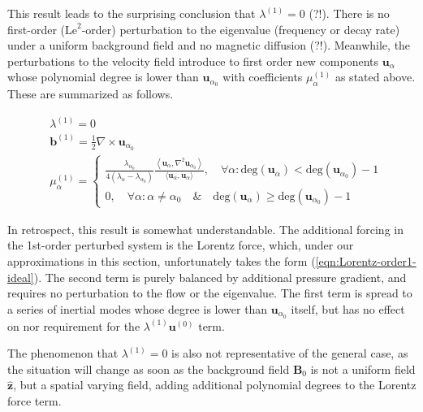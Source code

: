 %
This result leads to the surprising conclusion that $\lambda^{(1)} = 0$ (?!). There is no first-order ($\mathrm{Le}^2$-order) perturbation to the eigenvalue (frequency or decay rate) under a uniform background field and no magnetic diffusion (?!). 
Meanwhile, the perturbations to the velocity field introduce to first order new components $\mathbf{u}_\alpha$ whose polynomial degree is lower than $\mathbf{u}_{\alpha_0}$ with coefficients $\mu_\alpha^{(1)}$ as stated above. These are summarized as follows.
%
\begin{mdframed}[style=HighlightBox, frametitle={First-order perturbations under uniform background field, neglect magnetic diffusion}]
    \begin{align*}
        &\lambda^{(1)} = 0
        \\
        &\mathbf{b}^{(1)} = \frac{1}{2} \nabla\times \mathbf{u}_{\alpha_0} 
        \\
        &\mu_\alpha^{(1)} = \left\{\begin{aligned}
            \frac{\lambda_{\alpha_0}}{4(\lambda_\alpha - \lambda_{\alpha_0})} \frac{\left\langle \mathbf{u}_{\alpha}, \nabla^2 \mathbf{u}_{\alpha_0} \right\rangle}{\langle \mathbf{u}_{\alpha}, \mathbf{u}_{\alpha} \rangle},\quad \forall \alpha: \mathrm{deg}(\mathbf{u}_\alpha) < \mathrm{deg}(\mathbf{u}_{\alpha_0}) - 1 \\ 
            0,\quad \forall \alpha: \alpha \neq \alpha_0 \quad \& \quad \mathrm{deg}(\mathbf{u}_\alpha) \geq \mathrm{deg}(\mathbf{u}_{\alpha_0}) - 1
        \end{aligned}\right.
    \end{align*}
\end{mdframed}

In retrospect, this result is somewhat understandable. The additional forcing in the 1st-order perturbed system is the Lorentz force, which, under our approximations in this section, unfortunately takes the form (\ref{eqn:Lorentz-order1-ideal}). The second term is purely balanced by additional pressure gradient, and requires no perturbation to the flow or the eigenvalue. The first term is spread to a series of inertial modes whose degree is lower than $\mathbf{u}_{\alpha_0}$ itself, but has no effect on nor requirement for the $\lambda^{(1)} \mathbf{u}^{(0)}$ term. 

The phenomenon that $\lambda^{(1)} = 0$ is also not representative of the general case, as the situation will change as soon as the background field $\mathbf{B}_0$ is not a uniform field $\hat{\mathbf{z}}$, but a spatial varying field, adding additional polynomial degrees to the Lorentz force term.

